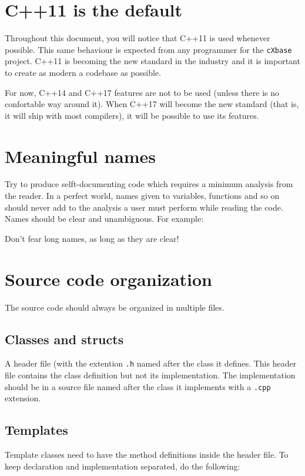 \section{C++11 is the default}
Throughout this document, you will notice that C++11 is used whenever possible. 
This same behaviour is expected from any programmer for the \texttt{cXbase} 
project. C++11 is becoming the new standard in the industry and it is important 
to create as modern a codebase as possible.

For now, C++14 and C++17 features are not to be used (unless there is no 
confortable way around it). When C++17 will become the new standard (that is,
it will ship with most compilers), it will be possible to use its features.


\section{Meaningful names}
Try to produce selft-documenting code which requires a minimum analysis from 
the reader. In a perfect world, names given to variables, functions and so on 
should never add to the analysis a user must perform while reading the code. 
Names should be clear and unambiguous. For example:


Don't fear long names, as long as they are clear!


\section{Source code organization}

The source code should always be organized in multiple files.

\subsection{Classes and structs}
A header file (with the extention \texttt{.h} named after the class it defines. 
This header file contains the class definition but not its implementation. The 
implementation should be in a source file named after the class it implements 
with a \texttt{.cpp} extension.

\subsection{Templates}
Template classes need to have the method definitions inside the header file. To 
keep declaration and implementation separated, do the following:

